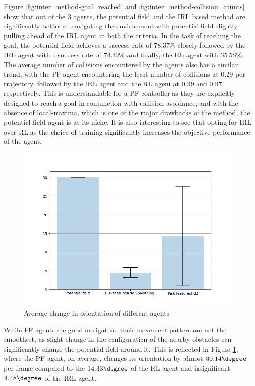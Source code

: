 Figure \ref{fig:inter_method-goal_reached} and \ref{fig:inter_method-collision_counts} show that out of the 3 agents, the potential field and the IRL based method are significantly better at navigating the environment with potential field slightly pulling ahead of the IRL agent in both the criteria. In the task of reaching the goal, the potential field achieves a success rate of $78.37\%$ closely followed by the IRL agent with a success rate of  $74.49\%$ and finally, the RL agent with $35.58\%$. The average number of collisions encountered by the agents also has a similar trend, with the PF agent encountering the least number of collisions at $0.29$ per trajectory, followed by the IRL agent and the RL agent at $0.39$ and $0.97$ respectively. This is understandable for a PF controller as they are explicitly designed to reach a goal in conjunction with collision avoidance, and with the absence of local-maxima, which is one of the major drawbacks of the method, the potential field agent is at its niche. It is also interesting to see that opting for IRL over RL as the choice of training significantly increases the objective performance of the agent.


\begin{figure}[htbp]
    \centering
    \includegraphics[width=0.7\linewidth]{plots/inter_method/trajectory_smoothness.png}
    \caption{Average change in orientation of different agents.}
    \label{fig:inter_method-change_in_orientation_avg}
\end{figure}
While PF agents are good navigators, their movement patters are not the smoothest, as slight change in the configuration of the nearby obstacles can significantly change the potential field around it. This is reflected in Figure \ref{fig:inter_method-change_in_orientation_avg}, where the PF agent, on average, changes its orientation by almost $30.14\degree$ per frame compared to the $14.33\degree$ of the RL agent and insignificant $4.48\degree$ of the IRL agent.

